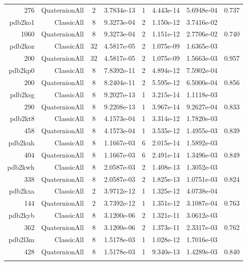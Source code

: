 \begin{xltabular}{\textwidth}{r|rcS[table-format=1.4e+2]cS[table-format=1.3e+2]S[table-format=1.4e+2]S[table-format=-1.3]}
276 & QuaternionAll & 2 & 3.7834e-13 & 1 & 4.443e-14 & 5.6948e-04 & 0.737\\  \addlinespace
pdb2ko1 & ClassicAll & 8 & 9.3273e-04 & 2 & 1.150e-12 & 3.7416e-02 & \\
1060 & QuaternionAll & 8 & 9.3273e-04 & 2 & 1.151e-12 & 2.7706e-02 & 0.740\\  \addlinespace
pdb2koz & ClassicAll & 32 & 4.5817e-05 & 2 & 1.075e-09 & 1.6365e-03 & \\
200 & QuaternionAll & 32 & 4.5817e-05 & 2 & 1.075e-09 & 1.5663e-03 & 0.957\\  \addlinespace
pdb2kp0 & ClassicAll & 8 & 7.8392e-11 & 2 & 4.894e-12 & 7.5902e-04 & \\
200 & QuaternionAll & 8 & 8.2404e-11 & 2 & 5.595e-12 & 6.5000e-04 & 0.856\\  \addlinespace
pdb2ksg & ClassicAll & 8 & 9.2027e-13 & 1 & 3.215e-14 & 1.1118e-03 & \\
290 & QuaternionAll & 8 & 9.2208e-13 & 1 & 3.967e-14 & 9.2627e-04 & 0.833\\  \addlinespace
pdb2kt8 & ClassicAll & 8 & 4.1573e-04 & 1 & 3.314e-12 & 1.7820e-03 & \\
458 & QuaternionAll & 8 & 4.1573e-04 & 1 & 3.535e-12 & 1.4955e-03 & 0.839\\  \addlinespace
pdb2kuh & ClassicAll & 8 & 1.1667e-03 & 6 & 2.015e-14 & 1.5892e-03 & \\
404 & QuaternionAll & 8 & 1.1667e-03 & 6 & 2.491e-14 & 1.3496e-03 & 0.849\\  \addlinespace
pdb2kwh & ClassicAll & 8 & 2.0587e-03 & 2 & 1.408e-13 & 1.3052e-03 & \\
338 & QuaternionAll & 8 & 2.0587e-03 & 2 & 1.825e-13 & 1.0751e-03 & 0.824\\  \addlinespace
pdb2kxa & ClassicAll & 2 & 3.9712e-12 & 1 & 1.325e-12 & 4.0738e-04 & \\
144 & QuaternionAll & 2 & 3.7392e-12 & 1 & 1.351e-12 & 3.1087e-04 & 0.763\\  \addlinespace
pdb2kyb & ClassicAll & 8 & 3.1200e-06 & 2 & 1.321e-11 & 3.0612e-03 & \\
362 & QuaternionAll & 8 & 3.1200e-06 & 2 & 1.373e-11 & 2.3317e-03 & 0.762\\  \addlinespace
pdb2l3m & ClassicAll & 8 & 1.5178e-03 & 1 & 1.028e-12 & 1.7016e-03 & \\
428 & QuaternionAll & 8 & 1.5178e-03 & 1 & 9.340e-13 & 1.4289e-03 & 0.840\\  \addlinespace

\end{xltabular}
